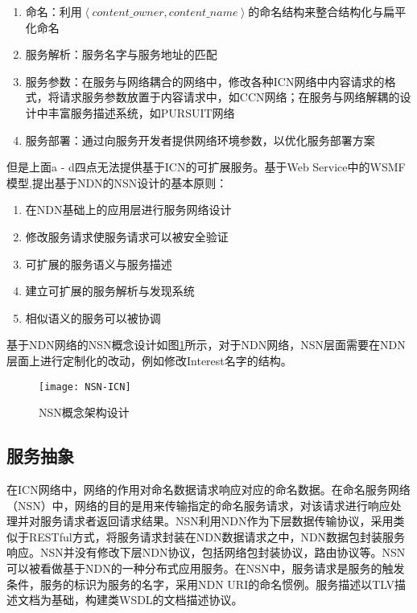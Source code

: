 \begin{enumerate}[a]
\item 命名：利用$\left\langle content\_owner, content\_name\right\rangle $的命名结构来整合结构化与扁平化命名
\item 服务解析：服务名字与服务地址的匹配
\item 服务参数：在服务与网络耦合的网络中，修改各种ICN网络中内容请求的格式，将请求服务参数放置于内容请求中，如CCN网络；在服务与网络解耦的设计中丰富服务描述系统，如PURSUIT网络
\item 服务部署：通过向服务开发者提供网络环境参数，以优化服务部署方案
\end{enumerate}

但是上面a - d四点无法提供基于ICN的可扩展服务。基于Web Service中的WSMF模型\cite{fensel2002web},提出基于NDN的NSN设计的基本原则：

\begin{enumerate}[a]
\item 在NDN基础上的应用层进行服务网络设计
\item 修改服务请求使服务请求可以被安全验证
\item 可扩展的服务语义与服务描述
\item 建立可扩展的服务解析与发现系统
\item 相似语义的服务可以被协调
\end{enumerate}

基于NDN网络的NSN概念设计如图\ref{fig:NSN-arc}所示，对于NDN网络，NSN层面需要在NDN层面上进行定制化的改动，例如修改Interest名字的结构。

\begin{figure}[H]
  \centering
  \texttt{[image: NSN-ICN]}
  \caption{NSN概念架构设计}
  \label{fig:NSN-arc}
\end{figure}

\subsection{服务抽象}
在ICN网络中，网络的作用对命名数据请求响应对应的命名数据。在命名服务网络（NSN）中，网络的目的是用来传输指定的命名服务请求，对该请求进行响应处理并对服务请求者返回请求结果。NSN利用NDN作为下层数据传输协议，采用类似于RESTful方式，将服务请求封装在NDN数据请求之中，NDN数据包封装服务响应。NSN并没有修改下层NDN协议，包括网络包封装协议，路由协议等。NSN可以被看做基于NDN的一种分布式应用服务。在NSN中，服务请求是服务的触发条件，服务的标识为服务的名字，采用NDN URI的命名惯例。服务描述以TLV描述文档为基础，构建类WSDL的文档描述协议。

